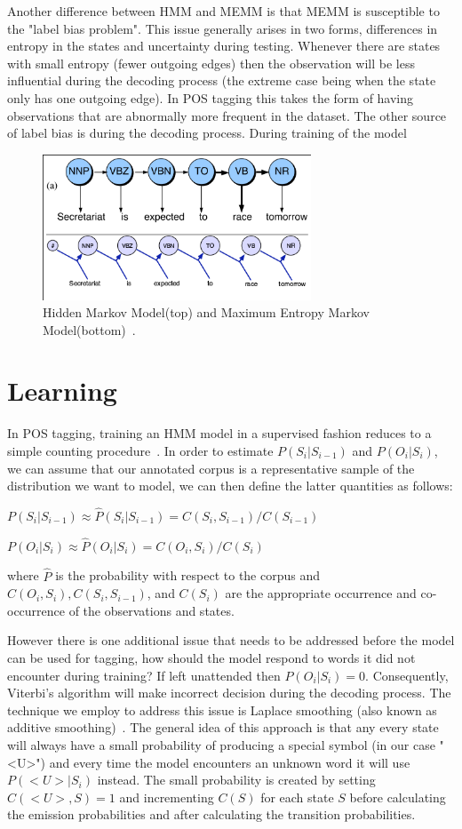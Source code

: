 \documentclass{acm_proc_article-sp}
\begin{document}
Another difference between HMM and MEMM is that MEMM is susceptible to the "label bias problem". This issue generally arises in two forms, differences in entropy in the states and uncertainty during testing. Whenever there are states with small entropy (fewer outgoing edges) then the observation will be less influential during the decoding process (the extreme case being when the state only has one outgoing edge). In POS tagging this takes the form of having observations that are abnormally more frequent in the dataset. The other source of label bias is during the decoding process. During training of the model
\begin{figure}[ht]
\centering
\includegraphics[width=80mm]{figures/memm.png}
\caption{Hidden Markov Model(top) and Maximum Entropy Markov Model(bottom)~\cite{nlpBook}. \label{hmmVmemm}}
\end{figure}

\section{Learning}
In POS tagging, training an HMM model in a supervised fashion reduces to a simple counting procedure~\cite{nlpBook}. In order to estimate $P( S_i | S_{i-1} )$ and $P( O_i | S_i )$, we can assume that our annotated corpus is a representative sample of the distribution we want to model, we can then define the latter quantities as follows:

$P( S_i | S_{i-1} ) \approx \hat{P}( S_i | S_{i-1} ) = C( S_i, S_{i-1} )/C( S_{i-1} )$

$P( O_i | S_i ) \approx \hat{P}( O_i | S_i ) = C( O_i, S_i )/C( S_i )$

where $\hat{P}$ is the probability with respect to the corpus and $C( O_i, S_i ), C( S_i, S_{i-1} )$, and $C( S_i )$ are the appropriate occurrence and co-occurrence of the observations and states.

However there is one additional issue that needs to be addressed before the model can be used for tagging, how should the model respond to words it did not encounter during training? If left unattended then $P( O_i | S_i ) = 0$. Consequently, Viterbi's algorithm will make incorrect decision during the decoding process. The technique we employ to address this issue is Laplace smoothing (also known as additive smoothing)~\cite{laplaceSmooth}. The general idea of this approach is that any every state will always have a small probability of producing a special symbol (in our case "<U>") and every time the model encounters an unknown word it will use $P( <U> | S_i )$ instead. The small probability is created by setting $C( <U>, S ) = 1$ and incrementing $C( S )$ for each state $S$ before calculating the emission probabilities and after calculating the transition probabilities.
\end{document}
